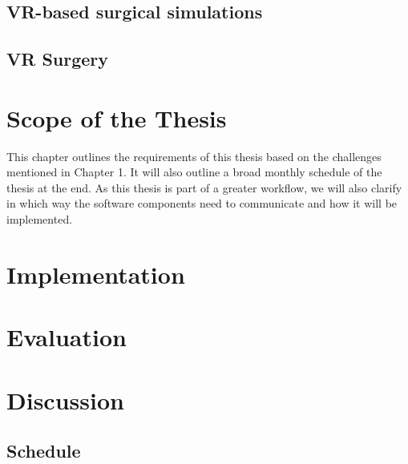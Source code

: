 \documentclass[twoside, parskip]{VRThesis} %
\begin{document}
\section{\label{sec::RelatedWork1}VR-based surgical simulations}


\section{\label{sec::RelatedWork2}VR Surgery}


\chapter{Scope of the Thesis}

This chapter outlines the requirements of this thesis based on the challenges mentioned in Chapter 1.
It will also outline a broad monthly schedule of the thesis at the end.
As this thesis is part of a greater workflow, we will also clarify in which way the software components need to communicate and how it will be implemented.

\chapter{Implementation}


\chapter{Evaluation}


\chapter{Discussion}


\section{Schedule}




%
\end{document}
